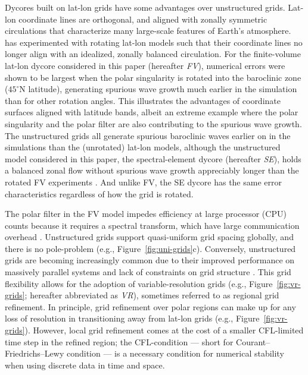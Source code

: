 \documentclass[draft]{agujournal2019}
\begin{document}
Dycores built on lat-lon grids have some advantages over unstructured grids. Lat-lon coordinate lines are orthogonal, and aligned with zonally symmetric circulations that characterize many large-scale features of Earth's atmosphere.  has experimented with rotating lat-lon models such that their coordinate lines no longer align with an idealized, zonally balanced circulation. For the finite-volume lat-lon dycore considered in this paper (hereafter \textit{FV}), numerical errors were shown to be largest when the polar singularity is rotated into the baroclinic zone ($45^{\circ}$N latitude), generating spurious wave growth much earlier in the simulation than for other rotation angles. This illustrates the advantages of coordinate surfaces aligned with latitude bands, albeit an extreme example where the polar singularity and the polar filter are also contributing to the spurious wave growth. The unstructured grids all generate spurious baroclinic waves earlier on in the simulations than the (unrotated) lat-lon models, although the unstructured model considered in this paper, the spectral-element dycore (hereafter \textit{SE}), holds a balanced zonal flow without spurious wave growth appreciably longer than the rotated FV experiments \cite{LJTN2010JAMES}. And unlike FV, the SE dycore has the same error characteristics regardless of how the grid is rotated.

The polar filter in the FV model impedes efficiency at large processor (CPU) counts because it requires a spectral transform, which have large communication overhead \cite{ST1995GEOS,DetAl2012IJHPCA}. Unstructured grids support quasi-uniform grid spacing globally, and there is no pole-problem (e.g., Figure~\ref{fig:uni-grids}c). Conversely, unstructured grids are becoming increasingly common due to their improved performance on massively parallel systems and lack of constraints on grid structure \cite{TTI1997JCP,PL2007JCP,WETAL2013GMD}. This grid flexibility allows for the adoption of variable-resolution grids (e.g., Figure~\ref{fig:vr-grids}; hereafter abbreviated as \textit{VR}), sometimes referred to as regional grid refinement. In principle, grid refinement over polar regions can make up for any loss of resolution in transitioning away from lat-lon grids (e.g., Figure~\ref{fig:vr-grids}).  However, local grid refinement comes at the cost of a smaller CFL-limited time step in the refined region; the CFL-condition --- short for Courant–Friedrichs–Lewy condition --- is a necessary condition for numerical stability when using discrete data in time and space.
\end{document}
